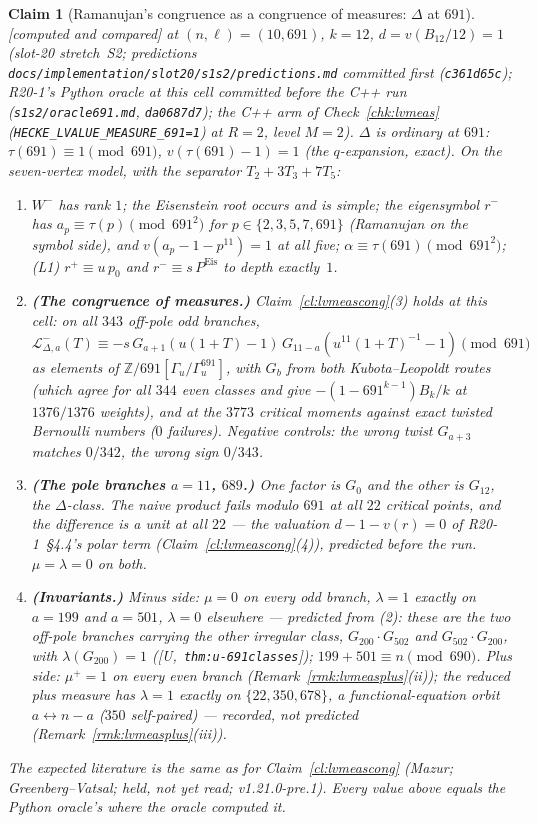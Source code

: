 \documentclass[11pt]{article}
\newtheorem{claim}[theorem]{Claim}
\theoremstyle{remark}
\newcommand{\Z}{\mathbb{Z}}
\newcommand{\Ga}{\Gamma}
\newcommand{\CMPD}{\textsf{[computed and compared]}}   %
\newcommand{\Ucite}[1]{[U,~\texttt{#1}]}               %
\begin{document}
\begin{claim}[Ramanujan's congruence as a congruence of measures: $\Delta$ at $691$]\label{cl:lvmeas691}
\CMPD{} at $(n,\ell)=(10,691)$, $k=12$, $d=v(B_{12}/12)=1$ (slot-20 stretch~S2; predictions \texttt{docs/implementation/slot20/s1s2/predictions.md} committed first (\texttt{c361d65c});
R20-1's Python oracle at this cell committed before the C++ run (\texttt{s1s2/oracle691.md}, \texttt{da0687d7}); the C++ arm of Check~\ref{chk:lvmeas} (\texttt{HECKE\_LVALUE\_MEASURE\_691=1}) at
$R=2$, level $M=2$). $\Delta$ is ordinary at $691$: $\tau(691)\equiv1\pmod{691}$, $v(\tau(691)-1)=1$ (the $q$-expansion, exact). On the seven-vertex model, with the separator $T_2+3T_3+7T_5$:
\begin{enumerate}
\item $W^{-}$ has rank $1$; the Eisenstein root occurs and is simple; the eigensymbol $r^{-}$ has $a_p\equiv\tau(p)\pmod{691^{2}}$ for $p\in\{2,3,5,7,691\}$ (Ramanujan on the symbol side), and
  $v(a_p-1-p^{11})=1$ at all five; $\alpha\equiv\tau(691)\pmod{691^{2}}$; (L1) $r^{+}\equiv u\,p_0$ and $r^{-}\equiv s\,P^{\mathrm{Eis}}$ to depth exactly~$1$.
\item \textbf{(The congruence of measures.)} Claim~\ref{cl:lvmeascong}(3) holds at this cell: on all $343$ off-pole odd branches,
  $\mathcal L^{-}_{\Delta,a}(T)\equiv-s\,G_{a+1}(u(1+T)-1)\,G_{11-a}(u^{11}(1+T)^{-1}-1)\pmod{691}$ as elements of $\Z/691[\Ga_u/\Ga_u^{691}]$, with $G_b$ from \emph{both} Kubota--Leopoldt routes
  (which agree for all $344$ even classes and give $-(1-691^{k-1})B_k/k$ at $1376/1376$ weights), and at the $3773$ critical moments against exact twisted Bernoulli numbers ($0$ failures).
  Negative controls: the wrong twist $G_{a+3}$ matches $0/342$, the wrong sign $0/343$.
\item \textbf{(The pole branches $a=11$, $689$.)} One factor is $G_0$ and the other is $G_{12}$, the $\Delta$-class. The naive product fails modulo $691$ at all $22$ critical points, and the
  difference is a unit at all $22$ --- the valuation $d-1-v(r)=0$ of R20-1~\S4.4's polar term (Claim~\ref{cl:lvmeascong}(4)), predicted before the run. $\mu=\lambda=0$ on both.
\item \textbf{(Invariants.)} Minus side: $\mu=0$ on every odd branch, $\lambda=1$ exactly on $a=199$ and $a=501$, $\lambda=0$ elsewhere --- predicted from (2): these are the two off-pole branches carrying
  the other irregular class, $G_{200}\cdot G_{502}$ and $G_{502}\cdot G_{200}$, with $\lambda(G_{200})=1$ (\Ucite{thm:u-691classes}); $199+501\equiv n\pmod{690}$. Plus side: $\mu^{+}=1$ on every even
  branch (Remark~\ref{rmk:lvmeasplus}(ii)); the reduced plus measure has $\lambda=1$ exactly on $\{22,350,678\}$, a functional-equation orbit $a\leftrightarrow n-a$ ($350$ self-paired) --- recorded,
  not predicted (Remark~\ref{rmk:lvmeasplus}(iii)).
\end{enumerate}
The expected literature is the same as for Claim~\ref{cl:lvmeascong} (Mazur; Greenberg--Vatsal; held, not yet read; v1.21.0-pre.1). Every value above equals the Python oracle's where the oracle computed it.
\end{claim}
\end{document}
